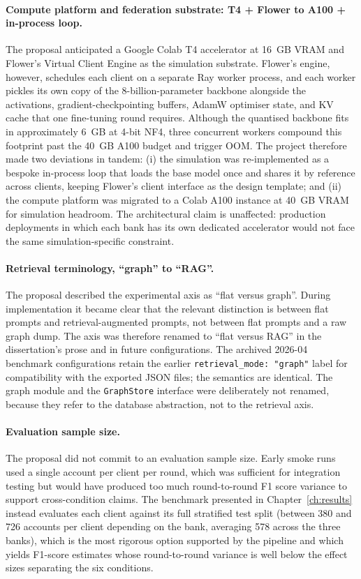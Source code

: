 \documentclass{report}
\begin{document}
\paragraph{Compute platform and federation substrate: T4 + Flower to A100 + in-process loop.} The proposal anticipated a Google Colab T4 accelerator at 16~GB VRAM and Flower's Virtual Client Engine as the simulation substrate. Flower's engine, however, schedules each client on a separate Ray worker process, and each worker pickles its own copy of the 8-billion-parameter backbone alongside the activations, gradient-checkpointing buffers, AdamW optimiser state, and KV cache that one fine-tuning round requires. Although the quantised backbone fits in approximately 6~GB at 4-bit NF4, three concurrent workers compound this footprint past the 40~GB A100 budget and trigger OOM. The project therefore made two deviations in tandem: (i) the simulation was re-implemented as a bespoke in-process loop that loads the base model once and shares it by reference across clients, keeping Flower's client interface as the design template; and (ii) the compute platform was migrated to a Colab A100 instance at 40~GB VRAM for simulation headroom. The architectural claim is unaffected: production deployments in which each bank has its own dedicated accelerator would not face the same simulation-specific constraint.

\paragraph{Retrieval terminology, \enquote{graph} to \enquote{RAG}.} The proposal described the experimental axis as \enquote{flat versus graph}. During implementation it became clear that the relevant distinction is between flat prompts and retrieval-augmented prompts, not between flat prompts and a raw graph dump. The axis was therefore renamed to \enquote{flat versus RAG} in the dissertation's prose and in future configurations. The archived 2026-04 benchmark configurations retain the earlier \texttt{retrieval\_mode: "graph"} label for compatibility with the exported JSON files; the semantics are identical. The graph module and the \texttt{GraphStore} interface were deliberately not renamed, because they refer to the database abstraction, not to the retrieval axis.

\paragraph{Evaluation sample size.} The proposal did not commit to an evaluation sample size. Early smoke runs used a single account per client per round, which was sufficient for integration testing but would have produced too much round-to-round F1 score variance to support cross-condition claims. The benchmark presented in Chapter~\ref{ch:results} instead evaluates each client against its full stratified test split (between 380 and 726 accounts per client depending on the bank, averaging 578 across the three banks), which is the most rigorous option supported by the pipeline and which yields F1-score estimates whose round-to-round variance is well below the effect sizes separating the six conditions.
\end{document}
